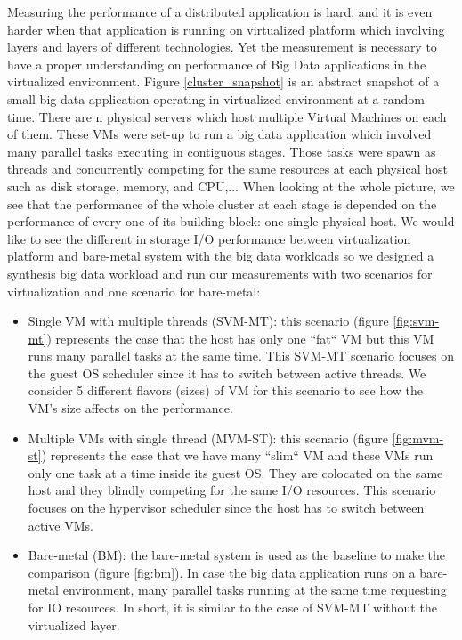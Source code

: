 \documentclass{acmsig}
\begin{document}
Measuring the performance of a distributed application is hard, and it is even harder when that application is running on virtualized platform which involving layers and layers of different technologies. Yet the measurement is necessary to have a proper understanding on performance of Big Data applications in the virtualized environment. Figure \ref{cluster_snapshot} is an abstract snapshot of a small big data application operating in virtualized environment at a random time. There are n physical servers which host multiple Virtual Machines on each of them. These VMs were set-up to run a big data application which involved many parallel tasks executing in contiguous stages. Those tasks were spawn as threads and concurrently competing for the same resources at each physical host such as disk storage, memory, and CPU,... When looking at the whole picture, we see that the performance of the whole cluster at each stage is depended on the performance of every one of its building block: one single physical host. We would like to see the different in storage I/O performance between virtualization platform and bare-metal system with the big data workloads so we designed a synthesis big data workload and run our measurements with two scenarios for virtualization and one scenario for bare-metal:
\begin{itemize}
\item Single VM with multiple threads (SVM-MT): this scenario (figure \ref{fig:svm-mt}) represents the case that the host has only one ``fat`` VM but this VM runs many parallel tasks at the same time. This SVM-MT scenario focuses on the guest OS scheduler since it has to switch between active threads. We consider 5 different flavors (sizes) of VM for this scenario to see how the VM's size affects on the performance.
\item Multiple VMs with single thread (MVM-ST): this scenario (figure \ref{fig:mvm-st}) represents the case that we have many ``slim`` VM and these VMs run only one task at a time inside its guest OS. They are colocated on the same host and they blindly competing for the same I/O resources. This scenario focuses on the hypervisor scheduler since the host has to switch between active VMs.
\item Bare-metal (BM): the bare-metal system is used as the baseline to make the comparison (figure \ref{fig:bm}). In case the big data application runs on a bare-metal environment, many parallel tasks running at the same time requesting for IO resources. In short, it is similar to the case of SVM-MT without the virtualized layer.
\end{itemize}
\end{document}
